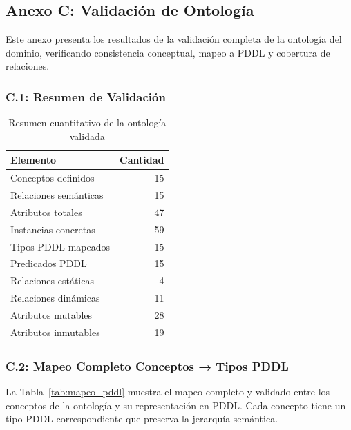 \documentclass[conference]{IEEEtran}
\begin{document}
    \subsection*{Anexo C: Validación de Ontología}

    Este anexo presenta los resultados de la validación completa de la ontología del dominio, verificando consistencia conceptual, mapeo a PDDL y cobertura de relaciones.

    \subsubsection*{C.1: Resumen de Validación}

    \begin{table}[H]
    \caption{Resumen cuantitativo de la ontología validada}
    \label{tab:validacion_resumen}
    \centering
    \small
    \begin{tabular}{@{}lr@{}}
    \toprule
    \textbf{Elemento} & \textbf{Cantidad} \\
    \midrule
    Conceptos definidos & 15 \\
    Relaciones semánticas & 15 \\
    Atributos totales & 47 \\
    Instancias concretas & 59 \\
    Tipos PDDL mapeados & 15 \\
    Predicados PDDL & 15 \\
    Relaciones estáticas & 4 \\
    Relaciones dinámicas & 11 \\
    Atributos mutables & 28 \\
    Atributos inmutables & 19 \\
    \bottomrule
    \end{tabular}
    \end{table}

    \subsubsection*{C.2: Mapeo Completo Conceptos → Tipos PDDL}

    La Tabla~\ref{tab:mapeo_pddl} muestra el mapeo completo y validado entre los conceptos de la ontología y su representación en PDDL. Cada concepto tiene un tipo PDDL correspondiente que preserva la jerarquía semántica.
\end{document}
